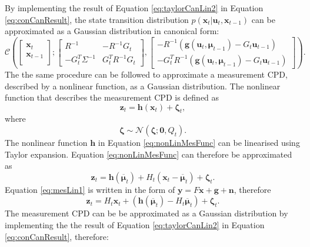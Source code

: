 \documentclass[12pt,oneside,openany,a4paper, %
afrikaans,english,
]{memoir}
\numberwithin{equation}{chapter}
\begin{document}
By implementing the result of Equation \ref{eq:taylorCanLin2} in Equation \ref{eq:conCanResult}, the state transition distribution $p(\bm{x}_t|\bm{u}_t,\bm{x}_{t-1})$ can be approximated as a Gaussian distribution in canonical form: 
\begin{equation}
\mathcal{C}\left(
\begin{bmatrix}
\bm{x}_t \\
\bm{x}_{t-1} \\
\end{bmatrix};
\begin{bmatrix}
R^{-1}  &  -R^{-1}G_t\\
-G_t^T\Sigma^{-1} & G_t^T R^{-1}G_t
\end{bmatrix}
, 
\begin{bmatrix}
-R^{-1}(\bm{g}(\bm{u}_t, \bm{\mu}_{t-1}) - G_t\bm{u}_{t-1})\\
-G_t^T R^{-1}(\bm{g}(\bm{u}_t, \bm{\mu}_{t-1}) - G_t\bm{u}_{t-1})
\end{bmatrix}
\right).
\end{equation}
The the same procedure can be followed to approximate a measurement CPD, described by a nonlinear function, as a Gaussian distribution. The nonlinear function that describes the measurement CPD is defined as
\begin{equation}\label{eq:nonLinMesFunc}
\bm{z}_t = \bm{h}(\bm{x}_t) + \bm{\zeta}_t,
\end{equation}
where
\begin{equation}
\bm{\zeta} \sim \mathcal{N}(\bm{\zeta}; \bm{0}, Q_t).
\end{equation}
The nonlinear function $\bm{h}$ in Equation \ref{eq:nonLinMesFunc} can be linearised using Taylor expansion. Equation \ref{eq:nonLinMesFunc} can therefore be approximated as
\begin{equation}\label{eq:mesLin1}
\bm{z}_t = \bm{h}(\bm{\overline{\mu}}_t) + H_t(\bm{x}_{t} - 
\bm{\overline{\mu}}_{t}) + \bm{\zeta}_t.
\end{equation}
Equation \ref{eq:mesLin1} is written in the form of $\bm{y} = F\bm{x} + \bm{g} + \bm{n}$, therefore
\begin{equation}\label{eq:mesLin2}
\bm{z}_t = H_t\bm{x}_{t} + (\bm{h}(\bm{\overline{\mu}}_t) - H_t\bm{\overline{\mu}}_{t}) + \bm{\zeta}_t.
\end{equation}
The measurement CPD can be be approximated as a Gaussian distribution by implementing the the result of Equation \ref{eq:taylorCanLin2} in Equation \ref{eq:conCanResult}, therefore:
\end{document}
